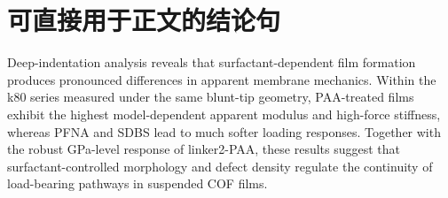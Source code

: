 \documentclass[UTF8,11pt]{ctexart}
\begin{document}
\section*{可直接用于正文的结论句}

\begin{sloppypar}
Deep-indentation analysis reveals that surfactant-dependent film formation produces pronounced differences in apparent membrane mechanics. Within the k80 series measured under the same blunt-tip geometry, PAA-treated films exhibit the highest model-dependent apparent modulus and high-force stiffness, whereas PFNA and SDBS lead to much softer loading responses. Together with the robust GPa-level response of linker2-PAA, these results suggest that surfactant-controlled morphology and defect density regulate the continuity of load-bearing pathways in suspended COF films.
\end{sloppypar}
\end{document}
